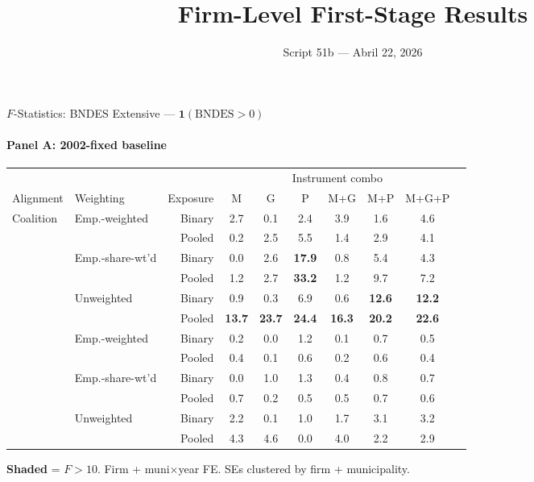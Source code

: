 \documentclass[aspectratio=169,10pt]{beamer}
\title{Firm-Level First-Stage Results}
\subtitle{Script 51b --- Abril 22, 2026}
\author{}
\date{}
\newcommand{\fpass}[1]{\cellcolor{pass}\textbf{#1}}
\begin{document}
\begin{frame}
\titlepage
\end{frame}


\begin{frame}[t]{$F$-Statistics: BNDES Extensive --- $\mathbf{1}(\text{BNDES}>0)$}
\framesubtitle{Panel A: 2002-fixed baseline}
\begin{center}
\footnotesize
\setlength{\tabcolsep}{3.5pt}
\renewcommand{\arraystretch}{1.05}
\begin{tabular}{@{}llrccccccc@{}}
\toprule
 & & & \multicolumn{6}{c}{Instrument combo} \\
\cmidrule(l{2pt}r{2pt}){4-9}
Alignment & Weighting & Exposure & M & G & P & M+G & M+P & M+G+P \\
\midrule
  \multirow{6}{*}{Coalition} & \multirow{2}{*}{Emp.-weighted} & Binary & 2.7 & 0.1 & 2.4 & 3.9 & 1.6 & 4.6 \\
   &  & Pooled & 0.2 & 2.5 & 5.5 & 1.4 & 2.9 & 4.1 \\
   & \multirow{2}{*}{Emp.-share-wt'd} & Binary & 0.0 & 2.6 & \fpass{17.9} & 0.8 & 5.4 & 4.3 \\
   &  & Pooled & 1.2 & 2.7 & \fpass{33.2} & 1.2 & 9.7 & 7.2 \\
   & \multirow{2}{*}{Unweighted} & Binary & 0.9 & 0.3 & 6.9 & 0.6 & \fpass{12.6} & \fpass{12.2} \\
   &  & Pooled & \fpass{13.7} & \fpass{23.7} & \fpass{24.4} & \fpass{16.3} & \fpass{20.2} & \fpass{22.6} \\
\addlinespace[5pt]
  \multirow{6}{*}{Party} & \multirow{2}{*}{Emp.-weighted} & Binary & 0.2 & 0.0 & 1.2 & 0.1 & 0.7 & 0.5 \\
   &  & Pooled & 0.4 & 0.1 & 0.6 & 0.2 & 0.6 & 0.4 \\
   & \multirow{2}{*}{Emp.-share-wt'd} & Binary & 0.0 & 1.0 & 1.3 & 0.4 & 0.8 & 0.7 \\
   &  & Pooled & 0.7 & 0.2 & 0.5 & 0.5 & 0.7 & 0.6 \\
   & \multirow{2}{*}{Unweighted} & Binary & 2.2 & 0.1 & 1.0 & 1.7 & 3.1 & 3.2 \\
   &  & Pooled & 4.3 & 4.6 & 0.0 & 4.0 & 2.2 & 2.9 \\
\bottomrule
\end{tabular}
\end{center}
{\scriptsize \colorbox{pass}{\textbf{Shaded}} = $F>10$. Firm + muni$\times$year FE. SEs clustered by firm + municipality.}
\end{frame}
\end{document}
